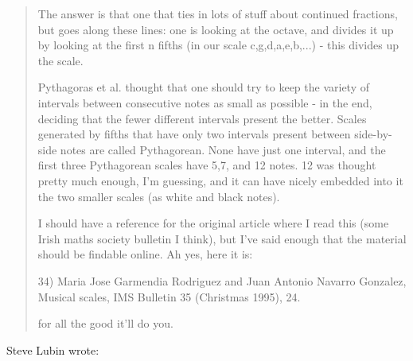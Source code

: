 \begin{quote}
   The answer is that one that ties in lots of stuff about continued
   fractions, but goes along these lines:  one is looking at the octave,
   and divides it up by looking at the first n fifths (in our scale
   c,g,d,a,e,b,...) - this divides up the scale.

   Pythagoras et al. thought that one should try to keep the variety of
   intervals between consecutive notes as small as possible - in the end,
   deciding that the fewer different intervals present the better.  Scales
   generated by fifths that have only two intervals present between
   side-by-side notes are called Pythagorean.  None have just one interval,
   and the first three Pythagorean scales have 5,7, and 12 notes.  12 was
   thought pretty much enough, I'm guessing, and it can have nicely
   embedded into it the two smaller scales (as white and black notes).

   I should have a reference for the original article where I read this
   (some Irish maths society bulletin I think), but I've said enough that
   the material should be findable online.  Ah yes, here it is:

   34) Maria Jose Garmendia Rodriguez and Juan Antonio Navarro Gonzalez,
   Musical scales, IMS Bulletin 35 (Christmas 1995), 24.

   for all the good it'll do you.
\end{quote}

Steve Lubin wrote:

